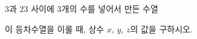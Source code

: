 $3$과 $23$ 사이에 $3$개의 수를 넣어서 만든 수열 \par\smallskip{}\par\smallskip\noindent 이 등차수열을 이룰 때, 상수 $x$, $y$, $z$의 값을 구하시오.
